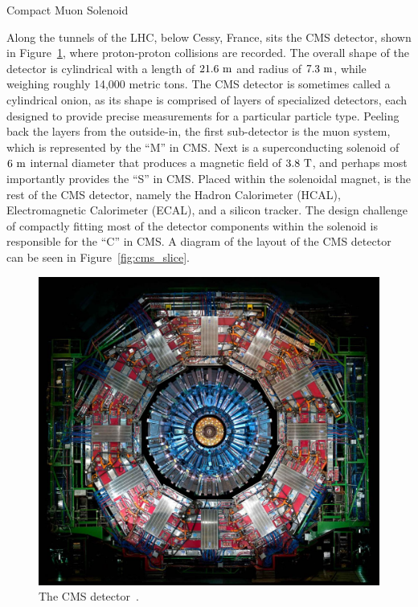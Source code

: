 \begin{section}{Compact Muon Solenoid}

Along the tunnels of the LHC, below Cessy, France, sits the CMS detector, shown in Figure~\ref{fig:cms_detector}, where proton-proton collisions are recorded.
The overall shape of the detector is cylindrical with a length of $21.6~\mathrm{m}$ and radius of $7.3~\mathrm{m}$, while weighing roughly 14,000 metric tons.
The CMS detector is sometimes called a cylindrical onion, as its shape is comprised of layers of specialized detectors, each designed to provide precise measurements for a particular particle type.
Peeling back the layers from the outside-in, the first sub-detector is the muon system, which is represented by the ``M'' in CMS. 
Next is a superconducting solenoid of $6~\mathrm{m}$ internal diameter that produces a magnetic field of $3.8~\mathrm{T}$, and perhaps most importantly provides the ``S'' in CMS.
Placed within the solenoidal magnet, is the rest of the CMS detector, namely the Hadron Calorimeter (HCAL), Electromagnetic Calorimeter (ECAL), and a silicon tracker.
The design challenge of compactly fitting most of the detector components within the solenoid is responsible for the ``C'' in CMS.
A diagram of the layout of the CMS detector can be seen in Figure~\ref{fig:cms_slice}.

\begin{figure}[tbp!]
\begin{center}
\includegraphics[angle=0,width=0.90\columnwidth]{fig/cms_detector.jpg}
\end{center}
\caption{The CMS detector~\cite{cms_detector}.}
\label{fig:cms_detector}
\end{figure}


\end{section}
